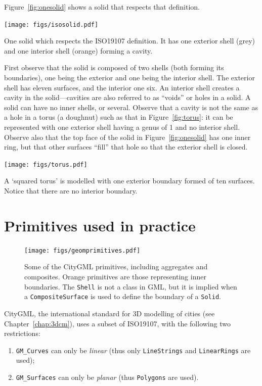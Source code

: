 %

Figure~\ref{fig:onesolid} shows a solid that respects that definition.
\begin{marginfigure}
  \centering
  \texttt{[image: figs/isosolid.pdf]}
  \caption{One solid which respects the ISO19107 definition. It has one exterior shell (grey) and one interior shell (orange) forming a cavity.}%
\label{fig:onesolid}
\end{marginfigure}
First observe that the solid is composed of two shells (both forming its boundaries), one being the exterior and one being the interior shell.
The exterior shell has eleven surfaces, and the interior one six.
An interior shell creates a cavity in the solid---cavities are also referred to as ``voids'' or holes in a solid.
A solid can have no inner shells, or several.
Observe that a cavity is not the same as a hole in a torus (a doughnut) such as that in Figure~\ref{fig:torus}: it can be represented with one exterior shell having a genus of 1 and no interior shell.
Observe also that the top face of the solid in Figure~\ref{fig:onesolid} has one inner ring, but that other surfaces ``fill'' that hole so that the exterior shell is closed.
\begin{marginfigure}
  \centering
  \texttt{[image: figs/torus.pdf]}
  \caption{A `squared torus' is modelled with one exterior boundary formed of ten surfaces. Notice that there are no interior boundary.}%
\label{fig:torus}
\end{marginfigure}


%
\section{Primitives used in practice}

\begin{figure}
  \centering
  \texttt{[image: figs/geomprimitives.pdf]}
  \caption{Some of the CityGML primitives, including aggregates and composites. Orange primitives are those representing inner boundaries. The \texttt{Shell} is not a class in GML, but it is implied when a \texttt{CompositeSurface} is used to define the boundary of a \texttt{Solid}.}%
\label{fig:geomprimitives}
\end{figure}

%

CityGML, the international standard for 3D modelling of cities (see Chapter~\ref{chap:3dcm}), uses a subset of ISO19107, with the following two restrictions: 
\begin{enumerate}
  \item \texttt{GM\_Curves} can only be \emph{linear} (thus only \texttt{LineStrings} and \texttt{Li\-near\-Rings} are used); 
  \item \texttt{GM\_Surfaces} can only be \emph{planar} (thus \texttt{Polygons} are used).
\end{enumerate}

